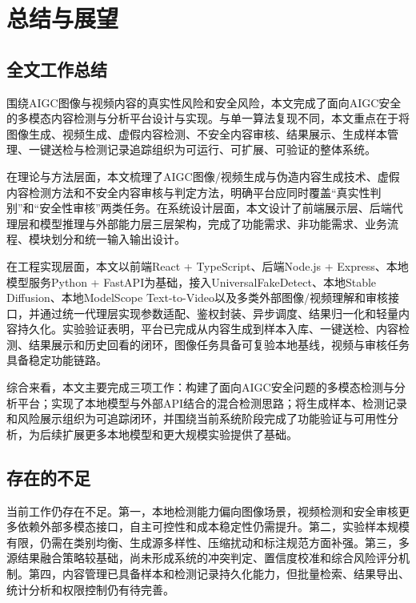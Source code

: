 
\chapter{总结与展望}

\section{全文工作总结}

围绕AIGC图像与视频内容的真实性风险和安全风险，本文完成了面向AIGC安全的多模态内容检测与分析平台设计与实现。与单一算法复现不同，本文重点在于将图像生成、视频生成、虚假内容检测、不安全内容审核、结果展示、生成样本管理、一键送检与检测记录追踪组织为可运行、可扩展、可验证的整体系统。

在理论与方法层面，本文梳理了AIGC图像/视频生成与伪造内容生成技术、虚假内容检测方法和不安全内容审核与判定方法，明确平台应同时覆盖“真实性判别”和“安全性审核”两类任务。在系统设计层面，本文设计了前端展示层、后端代理层和模型推理与外部能力层三层架构，完成了功能需求、非功能需求、业务流程、模块划分和统一输入输出设计。

在工程实现层面，本文以前端React + TypeScript、后端Node.js + Express、本地模型服务Python + FastAPI为基础，接入UniversalFakeDetect、本地Stable Diffusion、本地ModelScope Text-to-Video以及多类外部图像/视频理解和审核接口，并通过统一代理层实现参数适配、鉴权封装、异步调度、结果归一化和轻量内容持久化。实验验证表明，平台已完成从内容生成到样本入库、一键送检、内容检测、结果展示和历史回看的闭环，图像任务具备可复验本地基线，视频与审核任务具备稳定功能链路。

综合来看，本文主要完成三项工作：构建了面向AIGC安全问题的多模态检测与分析平台；实现了本地模型与外部API结合的混合检测思路；将生成样本、检测记录和风险展示组织为可追踪闭环，并围绕当前系统阶段完成了功能验证与可用性分析，为后续扩展更多本地模型和更大规模实验提供了基础。

\section{存在的不足}

当前工作仍存在不足。第一，本地检测能力偏向图像场景，视频检测和安全审核更多依赖外部多模态接口，自主可控性和成本稳定性仍需提升。第二，实验样本规模有限，仍需在类别均衡、生成源多样性、压缩扰动和标注规范方面补强。第三，多源结果融合策略较基础，尚未形成系统的冲突判定、置信度校准和综合风险评分机制。第四，内容管理已具备样本和检测记录持久化能力，但批量检索、结果导出、统计分析和权限控制仍有待完善。

